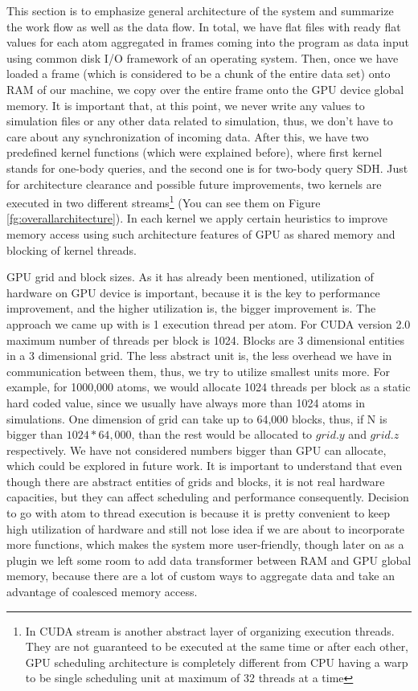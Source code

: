 \documentclass[12pt,letterpaper]{report}
\begin{document}
\noindent\hspace{3em}This section is to emphasize general architecture of the system and summarize the work flow as well as the data flow. In total, we have flat files with ready flat values for each atom aggregated in frames coming into the program as data input using common disk I/O framework of an operating system. Then, once we have loaded a frame (which is considered to be a chunk of the entire data set) onto RAM of our machine, we copy over the entire frame onto the GPU device global memory. It is important that, at this point, we never write any values to simulation files or any other data related to simulation, thus, we don't have to care about any synchronization of incoming data. After this, we have two predefined kernel functions (which were explained before), where first kernel stands for one-body queries, and the second one is for two-body query SDH. Just for architecture clearance and possible future improvements, two kernels are executed in two different streams\footnote{In CUDA stream is another abstract layer of organizing execution threads. They are not guaranteed to be executed at the same time or after each other, GPU scheduling architecture is completely different from CPU having a warp to be single scheduling unit at maximum of 32 threads at a time} (You can see them on Figure \ref{fg:overallarchitecture}). In each kernel we apply certain heuristics to improve memory access using such architecture features of GPU as shared memory and blocking of kernel threads.


\noindent\hspace{3em}GPU grid and block sizes. As it has already been mentioned, utilization of hardware on GPU device is important, because it is the key to performance improvement, and the higher utilization is, the bigger improvement is.
The approach we came up with is 1 execution thread per atom. For CUDA version 2.0 maximum number of threads per block is 1024. Blocks are 3 dimensional entities in a 3 dimensional grid. The less abstract unit is, the less overhead we have in communication between them, thus, we try to utilize smallest units more. For example, for 1000,000 atoms, we would allocate 1024 threads per block as a static hard coded value, since we usually have always more than 1024 atoms in simulations. One dimension of grid can take up to 64,000 blocks, thus, if N is bigger than $1024 * 64,000$, than the rest would be allocated to $grid.y$ and $grid.z$ respectively. We have not considered numbers bigger than GPU can allocate, which could be explored in future work. It is important to understand that even though there are abstract entities of grids and blocks, it is not real hardware capacities, but they can affect scheduling and performance consequently. Decision to go with atom to thread execution is because it is pretty convenient to keep high utilization of hardware and still not lose idea if we are about to incorporate more functions, which makes the system more user-friendly, though later on as a plugin we left some room to add data transformer between RAM and GPU global memory, because there are a lot of custom ways to aggregate data and take an advantage of coalesced memory access.
\end{document}
